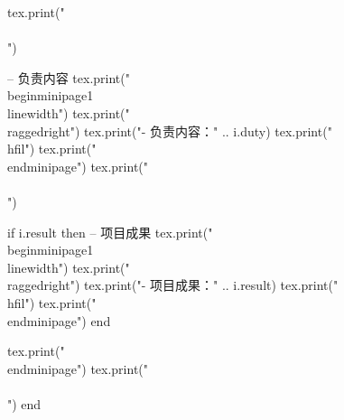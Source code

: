 \documentclass[10pt, a4paper, oneside]{ctexart}
\begin{document}
\begin{center}
\begin{minipage}{0.9\textwidth}
\begin{luacode}
                tex.print("\\\\[0.8em]")

                -- 负责内容
                tex.print("\\begin{minipage}{1\\linewidth}")
                tex.print("\\raggedright")
                tex.print("- 负责内容：" .. i.duty)
                tex.print("\\hfil")
                tex.print("\\end{minipage}")
                tex.print("\\\\[0.8em]")

                if i.result then
                    -- 项目成果
                    tex.print("\\begin{minipage}{1\\linewidth}")
                    tex.print("\\raggedright")
                    tex.print("- 项目成果：" .. i.result)
                    tex.print("\\hfil")
                    tex.print("\\end{minipage}")
                end

                tex.print("\\end{minipage}")
                tex.print("\\\\[1em]")
            end
        \end{luacode}
    \end{minipage}
\end{center}
\fi
\end{document}

